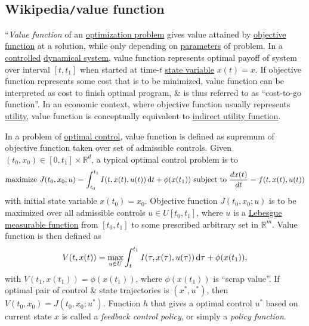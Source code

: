 \documentclass{article}
\begin{document}

\subsection{Wikipedia{\tt/}value function}
``{\it Value function} of an \href{https://en.wikipedia.org/wiki/Optimization_problem}{optimization problem} gives value attained by \href{https://en.wikipedia.org/wiki/Objective_function}{objective function} at a solution, while only depending on \href{https://en.wikipedia.org/wiki/Parameter}{parameters} of problem. In a \href{https://en.wikipedia.org/wiki/Control_theory}{controlled} \href{https://en.wikipedia.org/wiki/Dynamical_system}{dynamical system}, value function represents optimal payoff of system over interval $[t,t_1]$ when started at time-$t$ \href{https://en.wikipedia.org/wiki/State_variable}{state variable} $x(t) = x$. If objective function represents some cost that is to be minimized, value function can be interpreted as cost to finish optimal program, \& is thus referred to as ``cost-to-go function''. In an economic context, where objective function usually represents \href{https://en.wikipedia.org/wiki/Utility}{utility}, value function is conceptually equivalent to \href{https://en.wikipedia.org/wiki/Indirect_utility_function}{indirect utility function}.

In a problem of \href{https://en.wikipedia.org/wiki/Optimal_control}{optimal control}, value function is defined as supremum of objective function taken over set of admissible controls. Given $(t_0,x_0)\in[0,t_1]\times\mathbb{R}^d$, a typical optimal control problem is to
\begin{equation*}
	\mbox{maximize } J(t_0,x_0;u) = \int_{t_0}^{t_1} I(t,x(t),u(t))\,{\rm d}t + \phi(x(t_1))\mbox{ subject to }\frac{dx(t)}{dt} = f(t,x(t),u(t))
\end{equation*}
with initial state variable $x(t_0) = x_0$. Objective function $J(t_0,x_0;u)$ is to be maximized over all admissible controls $u\in U[t_0,t_1]$, where $u$ is a \href{https://en.wikipedia.org/wiki/Measurable_function}{Lebesgue measurable function} from $[t_0,t_1]$ to some prescribed arbitrary set in $\mathbb{R}^m$. Value function is then defined as
\begin{equation*}
	V(t,x(t)) = \max_{u\in U} \int_t^{t_1} I(\tau,x(\tau),u(\tau))\,{\rm d}\tau + \phi(x(t_1)),
\end{equation*}
with $V(t_1,x(t_1)) = \phi(x(t_1))$, where $\phi(x(t_1))$ is ``scrap value''. If optimal pair of control \& state trajectories is $(x^*,u^*)$, then $V(t_0,x_0) = J(t_0,x_0;u^*)$. Function $h$ that gives a optimal control $u^*$ based on current state $x$ is called a {\it feedback control policy}, or simply a {\it policy function}.
\end{document}
